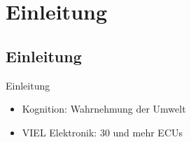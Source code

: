 \section{Einleitung}

\subsection{Einleitung}

\begin{frame}{Einleitung}
    \begin{itemize}
        \item Kognition: Wahrnehmung der Umwelt
        \item VIEL Elektronik: 30 und mehr ECUs
    \end{itemize}
\end{frame}